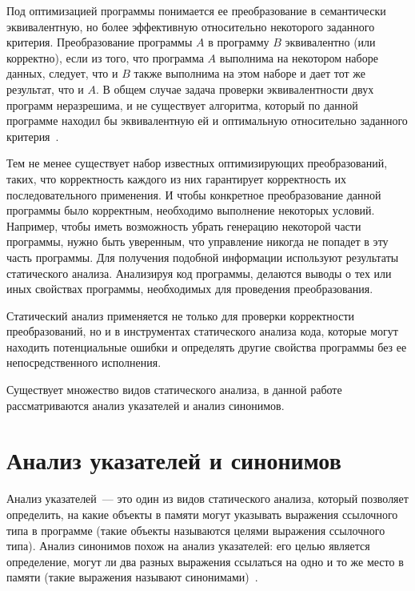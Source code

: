 \documentclass[14pt,titlepage]{extarticle}
\let\oldsection\section
\renewcommand{\section}{\newpage\oldsection}
\begin{document}
    Под оптимизацией программы понимается ее преобразование в
    семантически эквивалентную, но более эффективную относительно некоторого
    заданного критерия.
    Преобразование программы $A$ в программу $B$ эквивалентно (или корректно),
    если из того, что программа $A$ выполнима на некотором наборе данных,
    следует, что и $B$ также выполнима на этом наборе и дает тот же результат,
    что и $A$.
    В общем случае задача проверки эквивалентности двух программ неразрешима,
    и не существует алгоритма, который по данной программе находил бы
    эквивалентную ей и оптимальную относительно заданного
    критерия~\cite{kasjanov_translators}.

    Тем не менее существует набор известных оптимизирующих преобразований,
    таких, что корректность каждого из них гарантирует корректность их
    последовательного применения.
    И чтобы конкретное преобразование данной программы было корректным,
    необходимо выполнение некоторых условий. Например, чтобы иметь
    возможность убрать генерацию некоторой части программы, нужно быть
    уверенным, что управление никогда не попадет в эту часть программы.
    Для получения подобной информации используют результаты статического
    анализа. Анализируя код программы, делаются выводы о тех или иных свойствах
    программы, необходимых для проведения преобразования.

    Статический анализ применяется не только для проверки
    корректности преобразований, но и в инструментах статического анализа
    кода, которые могут находить потенциальные ошибки и определять
    другие свойства программы без ее непосредственного исполнения.

    Существует множество видов статического анализа, в данной работе
    рассматриваются анализ указателей и анализ синонимов.

  \section{Анализ указателей и синонимов}

    Анализ указателей~--- это один из видов статического анализа, который
    позволяет определить, на какие объекты в памяти могут указывать выражения
    ссылочного типа в программе (такие объекты называются целями выражения
    ссылочного типа). Анализ синонимов похож на анализ указателей: его целью
    является определение, могут ли два разных выражения ссылаться на одно и
    то же место в памяти (такие выражения называют синонимами)~\cite{andersen}.
\end{document}
